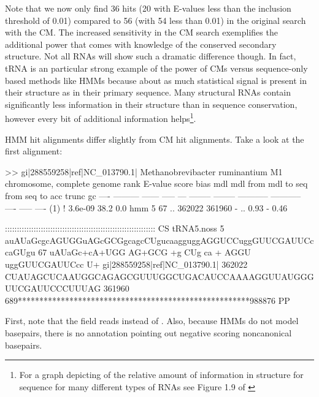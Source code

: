 Note that we now only find 36 hits (20 with E-values less than the
inclusion threshold of 0.01) compared to 56 (with 54 less than 0.01)
in the original search with the CM. The increased sensitivity in the
CM search exemplifies the additional power that comes with knowledge
of the conserved secondary structure. Not all RNAs will show such a
dramatic difference though. In fact, tRNA is an particular strong
example of the power of CMs versus sequence-only based methods like
HMMs because about as much statistical signal is present in their
structure as in their primary sequence. Many structural RNAs contain
significantly less information in their structure than in sequence
conservation, however every bit of additional information
helps\footnote{For a graph depicting of the relative amount of
information in structure for sequence for many different types of RNAs
see Figure 1.9 of \cite{Nawrocki09}}.

HMM hit alignments differ slightly from CM hit alignments. Take a look
at the first alignment:

\begin{sreoutput}
>> gi|288559258|ref|NC_013790.1|  Methanobrevibacter ruminantium M1 chromosome, complete genome
 rank     E-value  score  bias mdl mdl from   mdl to       seq from      seq to       acc trunc   gc
 ----   --------- ------ ----- --- -------- --------    ----------- -----------      ---- ----- ----
  (1) !   3.6e-09   38.2   0.0 hmm        5       67 ..      362022      361960 - .. 0.93     - 0.46

                                       ::::::::::::::::::::::::::::::::::::::::::::::::::::::::::::::: CS
                     tRNA5.noss      5 auAUaGcgcAGUGGuAGcGCGgcagcCUgucaagguggAGGUCCuggGUUCGAUUCccaGUgu 67    
                                        uAUaGc+cA+UGG AG+GCG  +g CUg ca  +   AGGU  uggGUUCGAUUCcc  U+ 
  gi|288559258|ref|NC_013790.1| 362022 CUAUAGCUCAAUGGCAGAGCGUUUGGCUGACAUCCAAAAGGUUAUGGGUUCGAUUCCCUUUAG 361960
                                       689******************************************************988876 PP
\end{sreoutput}

First, note that the  field reads  instead of
. Also, because HMMs do not model basepairs, there
is no
 annotation pointing out negative scoring noncanonical
basepairs. 

